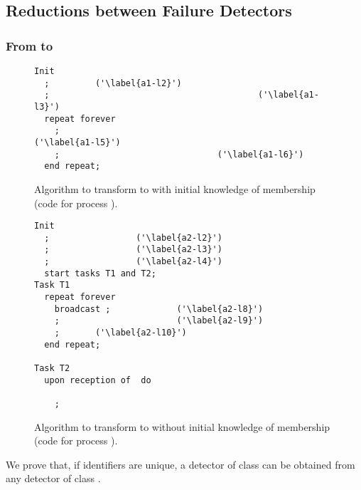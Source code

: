 \documentclass[10pt, conference, compsocconf]{IEEEtran}
\begin{document}
\newpage
\appendix



\subsection{Reductions between Failure Detectors}
\label{appendixred-FD}

\subsubsection{From  to }

\begin{figure}
\begin{lstlisting}
Init
  ;			('\label{a1-l2}')
  ;											('\label{a1-l3}')
  repeat forever
    ; 												('\label{a1-l5}')
    ;								('\label{a1-l6}')
  end repeat; 
\end{lstlisting}		
\caption{Algorithm to transform  to  with initial knowledge of membership (code for process ).}
\label{Fig-S-to-HS-si-mship}
\end{figure}


\begin{figure}
\begin{lstlisting}
Init
  ;					('\label{a2-l2}')
  ;					('\label{a2-l3}')
  ;					('\label{a2-l4}')
  start tasks T1 and T2;
Task T1
  repeat forever
    broadcast ;				('\label{a2-l8}')
    ; 						('\label{a2-l9}')
    ;		('\label{a2-l10}')
  end repeat;

Task T2	
  upon reception of  do
    
    ;  
\end{lstlisting}		
\caption{Algorithm to transform  to  without initial knowledge of membership (code for process ).}
\label{Fig-S-to-HS-no-mship}
\end{figure}

We prove that, if identifiers are unique, a detector of class  can be obtained from any detector  of class .
\end{document}
